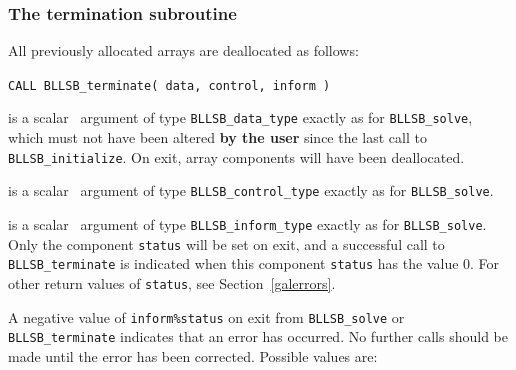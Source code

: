 \documentclass{galahad}
\newcommand{\packagename}{BLLSB}
\begin{document}
\subsubsection{The  termination subroutine}
All previously allocated arrays are deallocated as follows:
\vspace*{1mm}

\hspace{8mm}
{\tt CALL \packagename\_terminate( data, control, inform )}

\vspace*{-3mm}
\begin{description}

 is a scalar \intentinout\ argument of type
{\tt \packagename\_data\_type}
exactly as for
{\tt \packagename\_solve},
which must not have been altered {\bf by the user} since the last call to
{\tt \packagename\_initialize}.
On exit, array components will have been deallocated.

 is a scalar \intentin\ argument of type
{\tt \packagename\_control\_type}
exactly as for
{\tt \packagename\_solve}.

 is a scalar \intentout\ argument of type
{\tt \packagename\_inform\_type}
exactly as for
{\tt \packagename\_solve}.
Only the component {\tt status} will be set on exit, and a
successful call to
{\tt \packagename\_terminate}
is indicated when this  component {\tt status} has the value 0.
For other return values of {\tt status}, see Section~\ref{galerrors}.

\end{description}



\galerrors
A negative value of {\tt inform\%status} on exit from
{\tt \packagename\_solve}
or
{\tt \packagename\_terminate}
indicates that an error has occurred. No further calls should be made
until the error has been corrected. Possible values are:
\end{document}
